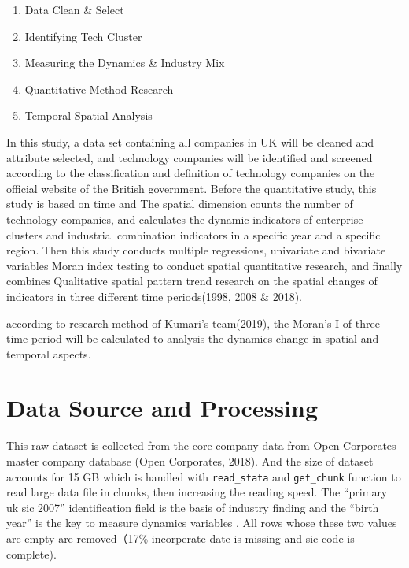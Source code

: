 \documentclass[
  12pt,
  oneside]{book}
\providecommand{\tightlist}{%
  \setlength{\itemsep}{0pt}\setlength{\parskip}{0pt}}
\begin{document}
\begin{enumerate}
\def\labelenumi{\arabic{enumi}.}
\tightlist
\item
  Data Clean \& Select
\item
  Identifying Tech Cluster
\item
  Measuring the Dynamics \& Industry Mix
\item
  Quantitative Method Research
\item
  Temporal Spatial Analysis
\end{enumerate}

In this study, a data set containing all companies in UK will be cleaned and attribute selected, and technology companies will be identified and screened according to the classification and definition of technology companies on the official website of the British government. Before the quantitative study, this study is based on time and The spatial dimension counts the number of technology companies, and calculates the dynamic indicators of enterprise clusters and industrial combination indicators in a specific year and a specific region. Then this study conducts multiple regressions, univariate and bivariate variables Moran index testing to conduct spatial quantitative research, and finally combines Qualitative spatial pattern trend research on the spatial changes of indicators in three different time periods(1998, 2008 \& 2018).

according to research method of Kumari's team(2019), the Moran's I of three time period will be calculated to analysis the dynamics change in spatial and temporal aspects.

\hypertarget{data-source-and-processing}{%
\section{Data Source and Processing}\label{data-source-and-processing}}

This raw dataset is collected from the core company data from Open Corporates master company database (Open Corporates, 2018). And the size of dataset accounts for 15 GB which is handled with \texttt{read\_stata} and \texttt{get\_chunk} function to read large data file in chunks, then increasing the reading speed. The ``primary uk sic 2007'' identification field is the basis of industry finding and the ``birth year'' is the key to measure dynamics variables . All rows whose these two values are empty are removed（17\% incorperate date is missing and sic code is complete).
\end{document}
